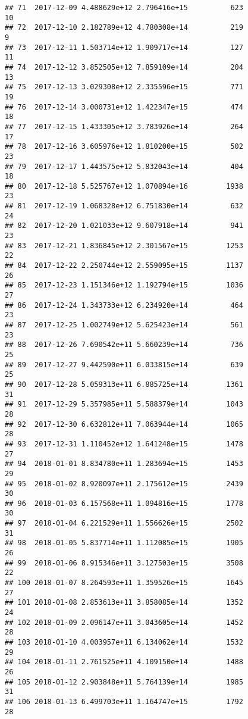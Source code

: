 \documentclass[]{article}
\begin{document}
\begin{verbatim}
## 71  2017-12-09 4.488629e+12 2.796416e+15          623              10
## 72  2017-12-10 2.182789e+12 4.780308e+14          219               9
## 73  2017-12-11 1.503714e+12 1.909717e+14          127              11
## 74  2017-12-12 3.852505e+12 7.859109e+14          204              13
## 75  2017-12-13 3.029308e+12 2.335596e+15          771              19
## 76  2017-12-14 3.000731e+12 1.422347e+15          474              18
## 77  2017-12-15 1.433305e+12 3.783926e+14          264              17
## 78  2017-12-16 3.605976e+12 1.810200e+15          502              23
## 79  2017-12-17 1.443575e+12 5.832043e+14          404              18
## 80  2017-12-18 5.525767e+12 1.070894e+16         1938              23
## 81  2017-12-19 1.068328e+12 6.751830e+14          632              24
## 82  2017-12-20 1.021033e+12 9.607918e+14          941              23
## 83  2017-12-21 1.836845e+12 2.301567e+15         1253              22
## 84  2017-12-22 2.250744e+12 2.559095e+15         1137              26
## 85  2017-12-23 1.151346e+12 1.192794e+15         1036              27
## 86  2017-12-24 1.343733e+12 6.234920e+14          464              23
## 87  2017-12-25 1.002749e+12 5.625423e+14          561              23
## 88  2017-12-26 7.690542e+11 5.660239e+14          736              25
## 89  2017-12-27 9.442590e+11 6.033815e+14          639              25
## 90  2017-12-28 5.059313e+11 6.885725e+14         1361              31
## 91  2017-12-29 5.357985e+11 5.588379e+14         1043              28
## 92  2017-12-30 6.632812e+11 7.063944e+14         1065              28
## 93  2017-12-31 1.110452e+12 1.641248e+15         1478              27
## 94  2018-01-01 8.834780e+11 1.283694e+15         1453              29
## 95  2018-01-02 8.920097e+11 2.175612e+15         2439              30
## 96  2018-01-03 6.157568e+11 1.094816e+15         1778              30
## 97  2018-01-04 6.221529e+11 1.556626e+15         2502              31
## 98  2018-01-05 5.837714e+11 1.112085e+15         1905              26
## 99  2018-01-06 8.915346e+11 3.127503e+15         3508              22
## 100 2018-01-07 8.264593e+11 1.359526e+15         1645              27
## 101 2018-01-08 2.853613e+11 3.858085e+14         1352              24
## 102 2018-01-09 2.096147e+11 3.043605e+14         1452              28
## 103 2018-01-10 4.003957e+11 6.134062e+14         1532              29
## 104 2018-01-11 2.761525e+11 4.109150e+14         1488              26
## 105 2018-01-12 2.903848e+11 5.764139e+14         1985              31
## 106 2018-01-13 6.499703e+11 1.164747e+15         1792              28

\end{verbatim}
\end{document}
